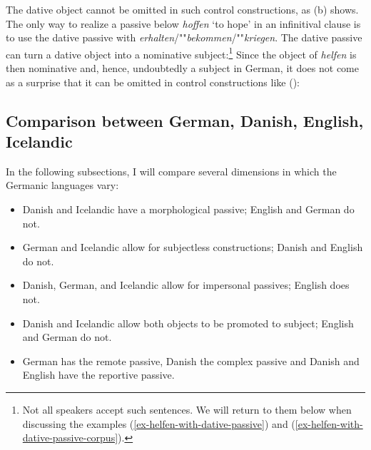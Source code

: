 \eal
{}
\zl
The dative object cannot be omitted in such control constructions, as (b) shows. The only way
to realize a passive below \emph{hoffen} `to hope' in an infinitival clause is to use the dative passive with
\emph{erhalten}/""\emph{bekommen}/""\emph{kriegen}. The dative passive can turn a dative object into a
nominative subject:\footnote{
  Not all speakers accept such sentences. We will return to them below when discussing the examples
  (\ref{ex-helfen-with-dative-passive}) and (\ref{ex-helfen-with-dative-passive-corpus}).
}
\z
\largerpage[-1]
Since the object of \emph{helfen} is then nominative and, hence, undoubtedly a subject in German, it
does not come as a surprise that it can be omitted in control constructions like ():
\z
{}


\subsection{Comparison between German, Danish, English, Icelandic}

In the following subsections, I will compare several dimensions in which the Germanic languages
vary:
\begin{itemize}
\item Danish and Icelandic have a morphological passive; English and German do not.

\item German and Icelandic allow for subjectless constructions; Danish and English do not.

\item Danish, German, and Icelandic allow for impersonal passives; English does not.

\item Danish and Icelandic allow both objects to be promoted to subject; English and German do not.

\item German has the remote passive, Danish the complex passive and Danish and English
  have the reportive passive.
\end{itemize}



